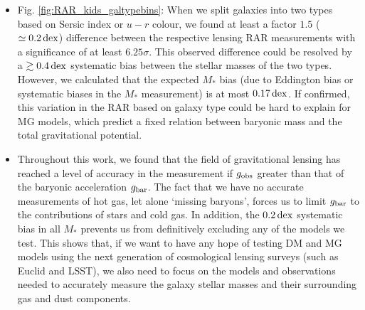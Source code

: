 \documentclass[usenatbib]{mnras}
\newcommand{\hMpc}{\, h^{-1}{\rm{Mpc}} }
\newcommand{\un}[1]{_{\rm #1}}
\newcommand{\dex}{\, {\rm dex}}
\begin{document}
\begin{itemize}
	\item Fig. \ref{fig:RAR_kids_galtypebins}: When we split galaxies into two types based on Sersic index or $u-r$ colour, we found at least a factor $1.5$ ($\simeq0.2 \dex$) difference between the respective lensing RAR measurements with a significance of at least $6.25 \sigma$. This observed difference could be resolved by a $\gtrsim 0.4 \dex$ systematic bias between the stellar masses of the two types. However, we calculated that the expected $M_*$ bias (due to Eddington bias or systematic biases in the $M_*$ measurement) is at most $0.17 \dex$. If confirmed, this variation in the RAR based on galaxy type could be hard to explain for MG models, which predict a fixed relation between baryonic mass and the total gravitational potential.
	
	\item Throughout this work, we found that the field of gravitational lensing has reached a level of accuracy in the measurement if $g\un{obs}$ greater than that of the baryonic acceleration $g\un{bar}$. The fact that we have no accurate measurements of hot gas, let alone `missing baryons', forces us to limit $g\un{bar}$ to the contributions of stars and cold gas. In addition, the $0.2 \dex$ systematic bias in all $M_*$ prevents us from definitively excluding any of the models we test. This shows that, if we want to have any hope of testing DM and MG models using the next generation of cosmological lensing surveys (such as Euclid and LSST), we also need to focus on the models and observations needed to accurately measure the galaxy stellar masses and their surrounding gas and dust components.
	
\end{itemize}
\end{document}

